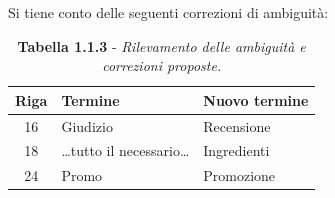 Si tiene conto delle seguenti correzioni di ambiguità:

\begin{table}[H]
\centering
\renewcommand{\arraystretch}{1.3} %
\setlength{\tabcolsep}{8pt}      %

\begin{tabularx}{\textwidth}{|c|l|X|}
\hline
\textbf{Riga} & \textbf{Termine} & \textbf{Nuovo termine} \\
\hline
16 & Giudizio & Recensione \\
18 & …tutto il necessario… & Ingredienti \\
24 & Promo & Promozione \\
\hline
\end{tabularx}
\caption*{\textbf{Tabella 1.1.3} - \textit{Rilevamento delle ambiguità e correzioni proposte.}}
\end{table}


